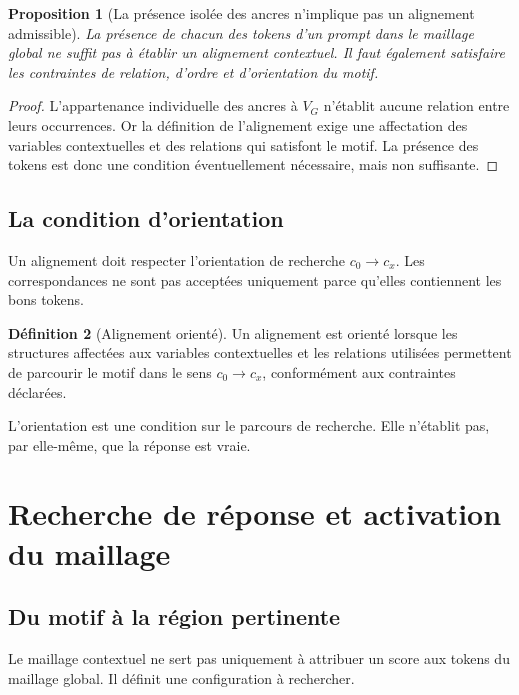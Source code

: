 \documentclass[11pt,a4paper]{report}
\theoremstyle{definition}
\newtheorem{definition}{Définition}[chapter]
\theoremstyle{plain}
\newtheorem{proposition}[definition]{Proposition}
\theoremstyle{remark}
\begin{document}
\begin{proposition}[La présence isolée des ancres n'implique pas
un alignement admissible]
La présence de chacun des tokens d'un prompt dans le maillage
global ne suffit pas à établir un alignement contextuel. Il faut
également satisfaire les contraintes de relation, d'ordre et
d'orientation du motif.
\end{proposition}

\begin{proof}
L'appartenance individuelle des ancres à \(V_G\) n'établit
aucune relation entre leurs occurrences. Or la définition de
l'alignement exige une affectation des variables contextuelles
et des relations qui satisfont le motif. La présence des tokens
est donc une condition éventuellement nécessaire, mais non
suffisante.
\end{proof}

\section{La condition d'orientation}

Un alignement doit respecter l'orientation de recherche
\(c_0\to c_x\). Les correspondances ne sont pas acceptées
uniquement parce qu'elles contiennent les bons tokens.

\begin{definition}[Alignement orienté]
Un alignement est orienté lorsque les structures affectées aux
variables contextuelles et les relations utilisées permettent
de parcourir le motif dans le sens \(c_0\to c_x\), conformément
aux contraintes déclarées.
\end{definition}

L'orientation est une condition sur le parcours de recherche.
Elle n'établit pas, par elle-même, que la réponse est vraie.

\chapter{Recherche de réponse et activation du maillage}

\section{Du motif à la région pertinente}

Le maillage contextuel ne sert pas uniquement à attribuer un
score aux tokens du maillage global. Il définit une configuration
à rechercher.
\end{document}
